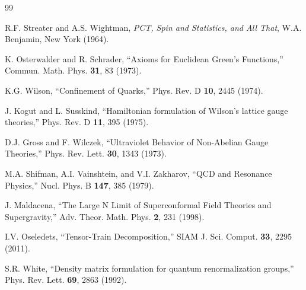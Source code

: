 \documentclass[12pt,a4paper]{article}
\begin{document}
\begin{thebibliography}{99}

R.F. Streater and A.S. Wightman,
\textit{PCT, Spin and Statistics, and All That},
W.A. Benjamin, New York (1964).

K. Osterwalder and R. Schrader,
``Axioms for Euclidean Green's Functions,''
Commun. Math. Phys. \textbf{31}, 83 (1973).

K.G. Wilson,
``Confinement of Quarks,''
Phys. Rev. D \textbf{10}, 2445 (1974).

J. Kogut and L. Susskind,
``Hamiltonian formulation of Wilson's lattice gauge theories,''
Phys. Rev. D \textbf{11}, 395 (1975).

D.J. Gross and F. Wilczek,
``Ultraviolet Behavior of Non-Abelian Gauge Theories,''
Phys. Rev. Lett. \textbf{30}, 1343 (1973).

M.A. Shifman, A.I. Vainshtein, and V.I. Zakharov,
``QCD and Resonance Physics,''
Nucl. Phys. B \textbf{147}, 385 (1979).

J. Maldacena,
``The Large N Limit of Superconformal Field Theories and Supergravity,''
Adv. Theor. Math. Phys. \textbf{2}, 231 (1998).

I.V. Oseledets,
``Tensor-Train Decomposition,''
SIAM J. Sci. Comput. \textbf{33}, 2295 (2011).

S.R. White,
``Density matrix formulation for quantum renormalization groups,''
Phys. Rev. Lett. \textbf{69}, 2863 (1992).

\end{thebibliography}
\end{document}
